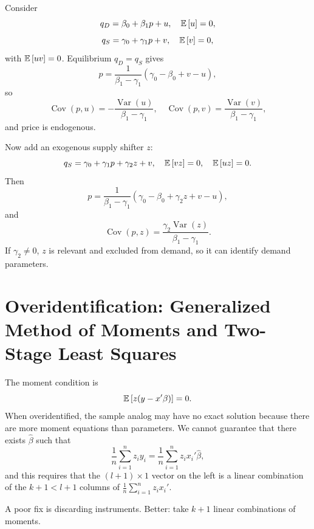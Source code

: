 \begin{example}
	Consider \[
		q_D = \beta_0 + \beta_1 p + u, \quad \mathbb{E}\left[u\right]=0
	,\] \[
		q_S = \gamma_0 + \gamma_1 p + v, \quad \mathbb{E}\left[v\right]=0
	,\]
	with $\mathbb{E}\left[uv\right]=0$. Equilibrium $q_D=q_S$ gives \[
		p = \frac{1}{\beta_1-\gamma_1}(\gamma_0-\beta_0+v-u)
	,\]
	so \[
		\operatorname{Cov}(p,u) = -\frac{\operatorname{Var}(u)}{\beta_1-\gamma_1}, \quad \operatorname{Cov}(p,v)=\frac{\operatorname{Var}(v)}{\beta_1-\gamma_1}
	,\]
	and price is endogenous.

	Now add an exogenous supply shifter $z$: \[
		q_S = \gamma_0 + \gamma_1 p + \gamma_2 z + v, \quad \mathbb{E}\left[vz\right]=0, \quad \mathbb{E}\left[uz\right]=0
	.\]
	Then \[
		p = \frac{1}{\beta_1-\gamma_1}(\gamma_0-\beta_0+\gamma_2 z+v-u)
	,\]
	and \[
		\operatorname{Cov}(p,z) = \frac{\gamma_2\operatorname{Var}(z)}{\beta_1-\gamma_1}
	.\]
	If $\gamma_2\ne 0$, $z$ is relevant and excluded from demand, so it can identify demand parameters.
\end{example}

\section{Overidentification: Generalized Method of Moments and Two-Stage Least Squares}

\begin{remark}
	The moment condition is \[
		\mathbb{E}\left[z(y-x'\beta)\right]=0
	.\]
	When overidentified, the sample analog may have no exact solution because there are more moment equations than parameters.
	We cannot guarantee that there exists $\hat{\beta}$ such that \[
		\frac{1}{n} \sum\limits_{i=1}^{n} z_i y_i  = \frac{1}{n} \sum\limits_{i=1}^{n} z_i x_i' \hat{\beta}
	,\] 
	and this requires that the $(l+1)\times 1$ vector on the left is a linear combination of the $k+1 < l+1$ columns of $\frac{1}{n} \sum_{i=1}^{n} z_i x_i'$.

	A poor fix is discarding instruments. Better: take $k+1$ linear combinations of moments.
\end{remark}



